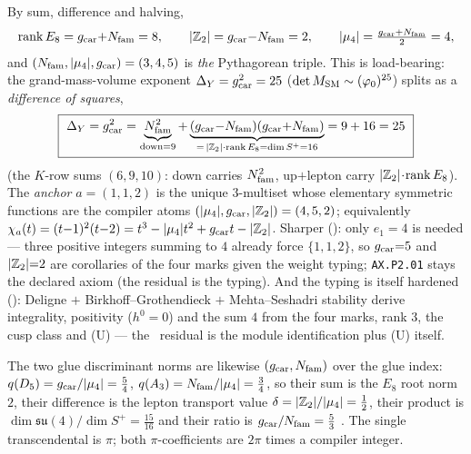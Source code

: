 \begin{keybox}
By sum, difference and halving,
\[
  \operatorname{rank}E_8=g_{\mathrm{car}}{+}N_{\mathrm{fam}}=8,\qquad |\mathbb Z_2|=g_{\mathrm{car}}{-}N_{\mathrm{fam}}=2,\qquad |\mu_4|=\tfrac{g_{\mathrm{car}}+N_{\mathrm{fam}}}{2}=4,
\]
and $(N_{\mathrm{fam}},|\mu_4|,g_{\mathrm{car}})=(3,4,5)$ is \emph{the} Pythagorean triple. This is load-bearing: the
grand-mass-volume exponent $\Delta_Y=g_{\mathrm{car}}^2=25$ ($\det M_{\mathrm{SM}}\sim(\varphi_0)^{25}$) splits as a
\emph{difference of squares},
\[
  \boxed{\ \Delta_Y=\gcar^2=\underbrace{\Nfam^2}_{\text{down}=9}
  +\underbrace{(\gcar{-}\Nfam)(\gcar{+}\Nfam)}_{=\,|\Z_2|\cdot\operatorname{rank}E_8=\dim S^+=16}
  =9+16=25\ }
\]
(the $K$-row sums $(6,9,10)$: down carries $N_{\mathrm{fam}}^2$, up$+$lepton carry $|\mathbb Z_2|\!\cdot\!\operatorname{rank}E_8$).
The \emph{anchor} $a=(1,1,2)$ is the unique $3$-multiset whose elementary symmetric functions are the
compiler atoms $(|\mu_4|,g_{\mathrm{car}},|\mathbb Z_2|)=(4,5,2)$; equivalently $\chi_a(t)=(t{-}1)^2(t{-}2)=t^3-|\mu_4|t^2+g_{\mathrm{car}} t-|\mathbb Z_2|$.
Sharper (): only $e_1{=}4$ is needed --- three positive integers
summing to $4$ already force $\{1,1,2\}$, so $g_{\mathrm{car}}{=}5$ and $|\mathbb Z_2|{=}2$ are corollaries of the four
marks given the weight typing; \texttt{AX.P2.01} stays the declared axiom (the residual is the typing).
And the typing is itself hardened (): Deligne $+$
Birkhoff--Grothendieck $+$ Mehta--Seshadri stability derive integrality, positivity ($h^0{=}0$) and the
sum $4$ from the four marks, rank $3$, the cusp class and (U) --- the \mC\ residual is the module
identification plus (U) itself.
\end{keybox}

The two glue discriminant norms are likewise $(g_{\mathrm{car}},N_{\mathrm{fam}})$ over the glue index: $q(D_5)=g_{\mathrm{car}}/|\mu_4|=\tfrac54$,
$q(A_3)=N_{\mathrm{fam}}/|\mu_4|=\tfrac34$, so their sum is the $E_8$ root norm $2$, their difference is the lepton
transport value $\delta=|\mathbb Z_2|/|\mu_4|=\tfrac12$, their product is $\dim\mathfrak{su}(4)/\dim S^+=\tfrac{15}{16}$
and their ratio is $g_{\mathrm{car}}/N_{\mathrm{fam}}=\tfrac53$ . The single transcendental is
$\pi$; both $\pi$-coefficients are $2\pi$ times a compiler integer.

